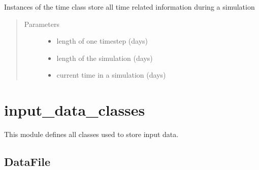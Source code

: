 \documentclass[letterpaper,10pt,english]{sphinxmanual}
\begin{document}
\begin{fulllineitems}
\label{\detokenize{index:feast.EmissionSimModules.simulation_classes.Time}}
Instances of the time class store all time related information during a simulation
\begin{quote}\begin{description}
\item[{Parameters}] \leavevmode\begin{itemize}
\item {} 
 \textendash{} length of one timestep (days)

\item {} 
 \textendash{} length of the simulation (days)

\item {} 
 \textendash{} current time in a simulation (days)

\end{itemize}

\end{description}\end{quote}

\end{fulllineitems}



\section{input\_data\_classes}
\label{\detokenize{index:module-feast.input_data_classes}}\label{\detokenize{index:input-data-classes}}
This module defines all classes used to store input data.


\subsection{DataFile}
\label{\detokenize{index:datafile}}
\end{document}
